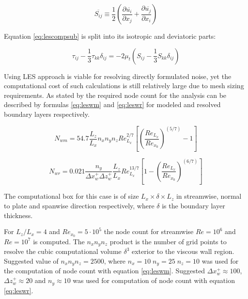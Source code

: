 \begin{equation} \label{eq:lesstrain}
\overline{S_{ij}} \equiv \frac{1}{2} \left( \frac{\partial \overline{u_i}}{\partial x_j} + \frac{\partial \overline{u_j}}{\partial x_i} \right)
\end{equation}

Equation \ref{eq:lescompsub} is split into its isotropic and deviatoric parts:

\begin{equation} \label{eq:lesdeviatoric}
\tau_{ij} - \frac{1}{3} \tau_{kk} \delta_{ij} = -2 \mu_{t} \left( S_{ij} - \frac{1}{3} S_{kk} \delta_{ij} \right)
\end{equation}

Using LES approach is viable for resolving directly formulated noise, yet the computational cost of such calculations is still relatively large due to mesh sizing requirements. As stated by \citep{LES_size} the required node count for the analysis can be described by formulas \ref{eq:leswm} and \ref{eq:leswr} for modeled and resolved boundary layers respectively.

\begin{equation} \label{eq:leswm}
N_{wm} = 54.7 \frac{L_z}{L_x} n_x n_y n_z Re^{2/7}_{L_x} \left[ \left( \frac{Re_{L_x}}{Re_{x_0}} \right)^{(5/7)} - 1\right]
\end{equation}

\begin{equation} \label{eq:leswr}
N_{wr} = 0.021 \frac{n_y}{\Delta x_w^{+} \Delta z_w^{+}} \frac{L_z}{L_x} Re^{13/7}_{L_x} \left[ 1 - \left( \frac{Re_{L_x}}{Re_{x_0}} \right)^{(6/7)} \right]
\end{equation}

The computational box for this case is of size $L_x \times \delta \times L_z$ in streamwise, normal to plate and spanwise direction respectively, where $\delta$ is the boundary layer thickness.

For $L_z / L_x = 4$ and $Re_{x_0} = 5 \cdot 10^5$ the node count for streamwise $Re = 10^6$ and $Re = 10^7$ is computed. The $n_x n_y n_z$ product is the number of grid points to resolve the cubic computational volume $\delta^3$ exterior to the viscous wall region. Suggested value of $n_x n_y n_z = 2500$, where $n_x = 10 \; n_y = 25 \; n_z = 10$ was used for the computation of node count with equation \ref{eq:leswm}. Suggested $\Delta x_w^{+} \approx 100$, $\Delta z_w^{+} \approx 20$ and $n_y \approx 10$ was used for computation of node count with equation \ref{eq:leswr}.

